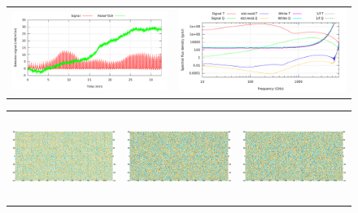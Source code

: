 \documentclass{article}
\begin{document}
\begin{figure}
	\centering
	\hspace*{-7mm}\begin{tabular}{m{75mm}m{75mm}}
		\vspace*{2.0mm}\includegraphics[width=79mm]{plots/noise_oof_example.pdf} &
			\includegraphics[width=85mm]{plots/noise_abs_log_log_wide.pdf}
	\end{tabular}
	\hspace*{-5mm}\begin{tabular}{m{56mm}m{54.4mm}m{56mm}}
		\includegraphics[height=28mm,clip,trim=0 8mm 7.5mm 0]{plots/noise_oof_sb_map_0.png} &
		\includegraphics[height=28mm,clip,trim=7.5mm 8mm 7.5mm 0]{plots/noise_oof_sb_map_1.png} &
		\includegraphics[height=28mm,clip,trim=7.5mm 8mm 0 0]{plots/noise_oof_sb_map_2.png} \\

\end{tabular}
\end{figure}
\end{document}
